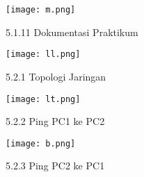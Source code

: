 \begin{figure}
    \centering
    \texttt{[image: m.png]}
    \caption{5.1.11 Dokumentasi Praktikum}
    \label{fig:enter-label}
\end{figure}
\begin{figure}
    \centering
    \texttt{[image: ll.png]}
    \caption{5.2.1 Topologi Jaringan}
    \label{fig:enter-label}
\end{figure}
\begin{figure}
    \centering
    \texttt{[image: lt.png]}
    \caption{5.2.2 Ping PC1 ke PC2}
    \label{fig:enter-label}
\end{figure}
\begin{figure}
    \centering
    \texttt{[image: b.png]}
    \caption{5.2.3 Ping PC2 ke PC1}
    \label{fig:enter-label}
\end{figure}